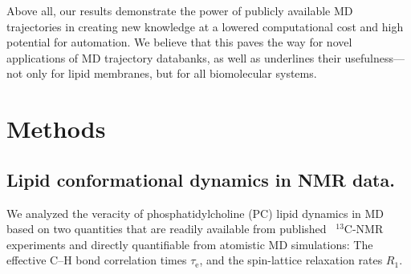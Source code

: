 \documentclass[journal=jcisd8,manuscript=article,layout=twocolumn]{achemso}
\begin{document}
Above all, our results demonstrate the power of publicly available MD trajectories
in creating new knowledge at a lowered computational cost and high potential for automation.  
We believe that this paves the way for novel applications of MD trajectory
databanks, as well as underlines their usefulness---not only for lipid membranes,
but for all biomolecular systems.


\section{Methods}
\subsection*{Lipid conformational dynamics in NMR data.}\label{sec:theory}
%
We analyzed the veracity of phosphatidylcholine (PC) lipid dynamics in MD based on two quantities that are readily available
from published~\cite{ferreira15,pham15,Volke:1995a,Antila:2020a} $^{13}$C-NMR experiments and
directly quantifiable from atomistic MD simulations:
The effective C--H bond correlation times $\tau_\mathrm{e}$, and
the spin-lattice relaxation rates $R_1$.
\end{document}

